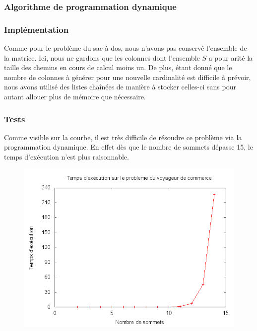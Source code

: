 \subsubsection{Algorithme de programmation dynamique}



\subsubsection{Implémentation}
Comme pour le problème du sac à dos, nous n'avons pas conservé l'ensemble de la matrice.
Ici, nous ne gardons que les colonnes dont l'ensemble $S$ a pour arité la taille des chemins en cours
de calcul moins un.
De plus, étant donné que le nombre de colonnes à générer pour une nouvelle cardinalité est difficile à prévoir,
nous avons utilisé des listes chaînées de manière à stocker celles-ci sans pour autant allouer plus de mémoire que nécessaire.


\subsubsection{Tests}
Comme visible sur la courbe, il est très difficile de résoudre ce problème via la programmation dynamique. En effet dès que le nombre de sommets dépasse 15, le temps d'exécution n'est plus raisonnable.

\begin{figure}[H]
	\includegraphics[width=\linewidth]{../pratique/prog_dynamique_dev/res/tsp.png}
\end{figure}


